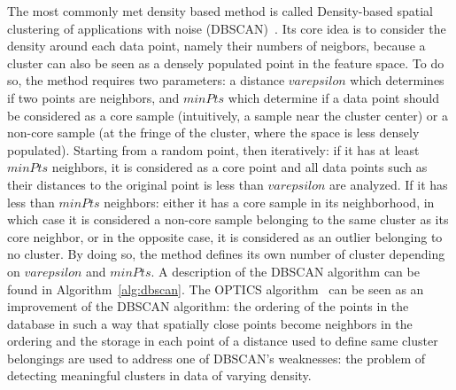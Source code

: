 The most commonly met density based method is called Density-based spatial clustering of applications with noise (DBSCAN)~\cite{ester1996density}. Its core idea is to consider the density around each data point, namely their numbers of neigbors, because a cluster can also be seen as a densely populated point in the feature space. To do so, the method requires two parameters: a distance $varepsilon$ which determines if two points are neighbors, and $minPts$ which determine if a data point should be considered as a core sample (intuitively, a sample near the cluster center) or a non-core sample (at the fringe of the cluster, where the space is less densely populated). Starting from a random point, then iteratively: if it has at least $minPts$ neighbors, it is considered as a core point and all data points such as their distances to the original point is less than $varepsilon$ are analyzed. If it has less than $minPts$ neighbors: either it has a core sample in its neighborhood, in which case it is considered a non-core sample belonging to the same cluster as its core neighbor, or in the opposite case, it is considered as an outlier belonging to no cluster. By doing so, the method defines its own number of cluster depending on $varepsilon$ and $minPts$. A description of the DBSCAN algorithm can be found in Algorithm~\ref{alg:dbscan}. The OPTICS algorithm~\cite{ankerst1999optics} can be seen as an improvement of the DBSCAN algorithm: the ordering of the points in the database in such a way that spatially close points become neighbors in the ordering and the storage in each point of a distance used to define same cluster belongings are used to address one of DBSCAN's weaknesses: the problem of detecting meaningful clusters in data of varying density.

